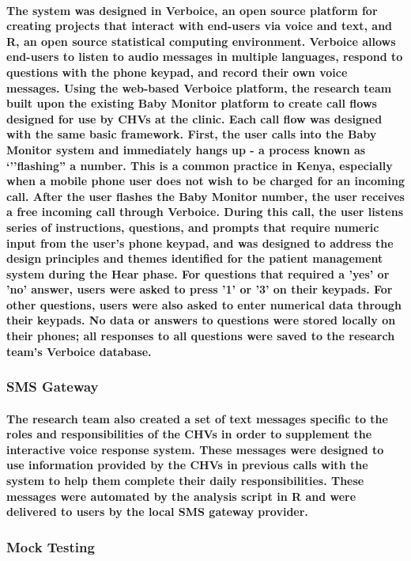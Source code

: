 \paragraph{The system was designed in Verboice, an open source platform for creating projects that interact with end-users via voice and text, and R, an open source statistical computing environment. Verboice allows end-users to listen to audio messages in multiple languages, respond to questions with the phone keypad, and  record their own voice messages. Using the web-based Verboice platform, the research team built upon the existing Baby Monitor platform to create call flows designed for use by CHVs at the clinic. Each call flow was designed with the same basic framework. First, the user calls into the Baby Monitor system and immediately hangs up - a process known as `''flashing'' a number. This is a common practice in Kenya, especially when a mobile phone user does not wish to be charged for an incoming call. After the user flashes the Baby Monitor number, the user receives a free incoming call through Verboice. During this call, the user listens series of instructions, questions, and prompts that require numeric input from the user's phone keypad, and was designed to address the design principles and themes identified for the patient management system during the Hear phase. For questions that required a 'yes' or 'no' answer, users were asked to press '1' or '3' on their keypads. For other questions, users were also asked to enter numerical data through their keypads. No data or answers to questions were stored locally on their phones; all responses to all questions were saved to the research team's Verboice database.}

\subsubsection{SMS Gateway}
\paragraph{The research team also created a set of text messages specific to the roles and responsibilities of the CHVs in order to supplement the interactive voice response system. These messages were designed to use information provided by the CHVs in previous calls with the system to help them complete their daily responsibilities. These messages were automated by the analysis script in R and were delivered to users by the local SMS gateway provider.}

\subsubsection{Mock Testing}
